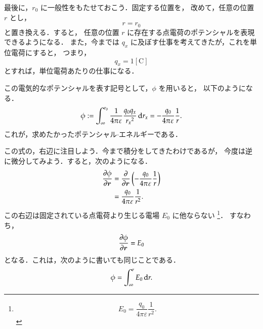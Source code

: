            最後に，$r_{0}$ に一般性をもたせておこう．固定する位置を，
            改めて，任意の位置 $r$ とし，
                \begin{equation*}
                    r=r_{0}
                \end{equation*}
            と置き換える．すると，
            任意の位置 $r$ に存在する点電荷のポテンシャルを表現できるようになる．
            また，今までは $q_{x}$ に及ぼす仕事を考えてきたが，これを単位電荷にすると，
            つまり，
                \begin{equation*}
                    q_{x} = 1[\mathrm{C}]
                \end{equation*}
            とすれば，単位電荷あたりの仕事になる．

            この電気的なポテンシャルを表す記号として，$\phi$ を用いると，
            以下のようになる．
                \begin{align}
                    \phi
                    :=
                    \int_{\infty}^{r_{0}}
                        \frac{1}{4 \pi \varepsilon}
                        \frac{q_{0}q_{x}}{{r_{x}}^{2}}
                    \,\mathrm{d} r_{x}
                    =
                    -\frac{q_{0}}{4 \pi \varepsilon} \frac{1}{r}.
                \end{align}
            これが，求めたかったポテンシャル$\cdot$エネルギーである．

            この式の，右辺に注目しよう．今まで積分をしてきたわけであるが，
            今度は逆に微分してみよう．すると，次のようになる．
                \begin{align*}
                    \frac{\partial \phi}{\partial \boldsymbol{r}}
                  &= \frac{\partial}{\partial \boldsymbol{r}}
                        \left(
                            -\frac{q_{0}}{4 \pi \varepsilon} \frac{1}{r}
                        \right) \\
                  &= \frac{q_{0}}{4 \pi \varepsilon} \frac{1}{r^{2}}.
                \end{align*}
            この右辺は固定されている点電荷より生じる電場 $E_{0}$ に他ならない
                \footnote{
                    \begin{equation*}
                        E_{0} = \frac{q_{0}}{4 \pi \varepsilon} \frac{1}{r^{2}}.
                    \end{equation*}
                }．
            すなわち，
                \begin{align*}
                    \frac{\partial \phi}{\partial \boldsymbol{r}} = E_{0}
                \end{align*}
            となる．これは，次のように書いても同じことである．
                \begin{align*}
                    \phi = \int_{\infty}^{r} E_{0} \,\mathrm{d} r.
                \end{align*}

